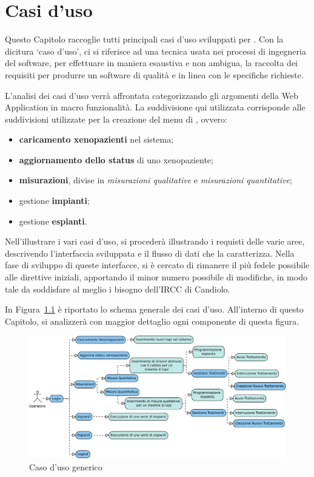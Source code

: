 \chapter{Casi d'uso}\label{chap:xenocase}

Questo Capitolo raccoglie tutti principali casi d'uso sviluppati per \Xeno. Con la dicitura `caso d'uso', ci si riferisce ad una tecnica usata nei processi di ingegneria del software, per effettuare in maniera esaustiva e non ambigua, la raccolta dei requisiti per produrre un software di qualit\`a e in linea con le specifiche richieste.

L'analisi dei casi d'uso verr\`a affrontata categorizzando gli argomenti della Web Application in macro funzionalit\`a. La suddivisione qui utilizzata corrisponde alle suddivisioni utilizzate per la creazione del menu di \Xeno, ovvero:
\begin{itemize}
	\item \textbf{caricamento xenopazienti} nel sistema;
	\item \textbf{aggiornamento dello status} di uno xenopaziente;
	\item \textbf{misurazioni}, divise in \textit{misurazioni qualitative} e \textit{misurazioni quantitative};
	\item gestione \textbf{impianti};
	\item gestione \textbf{espianti}.
\end{itemize}	

Nell'illustrare i vari casi d'uso, si proceder\`a illustrando i requisti delle varie aree, descrivendo l'interfaccia sviluppata e il flusso di dati che la caratterizza. Nella fase di sviluppo di queste interfacce, si \`e cercato di rimanere il pi\`u fedele possibile alle direttive iniziali, apportando il minor numero possibile di modifiche, in modo tale da soddisfare al meglio i bisogno dell'IRCC di Candiolo.

In Figura~\ref{fig:useCase} \`e riportato lo schema generale dei casi d'uso. All'interno di questo Capitolo, si analizzer\`a con maggior dettaglio ogni componente di questa figura.

\begin{figure}[h]
\begin{center}
\includegraphics[width=1\textwidth]{./Figure/use_case}
\end{center}
\caption{Caso d'uso generico}\label{fig:useCase}
\end{figure}

